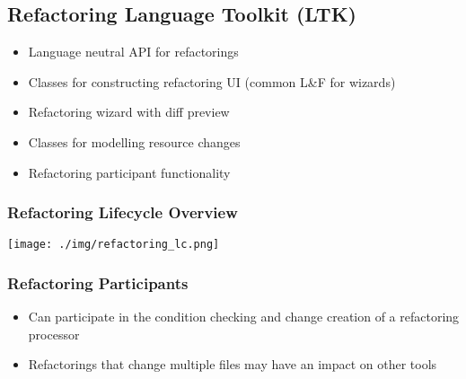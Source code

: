 \subsection{Refactoring Language Toolkit (LTK)}
\begin{itemize}
    \item Language neutral API for refactorings
    \item Classes for constructing refactoring UI (common L\&F for wizards)
    \item Refactoring wizard with diff preview
    \item Classes for modelling resource changes
    \item Refactoring participant functionality
\end{itemize}
\subsubsection{Refactoring Lifecycle Overview}
\texttt{[image: ./img/refactoring\_lc.png]}

\subsubsection{Refactoring Participants}
\begin{itemize}
    \item Can participate in the condition checking and change creation of a refactoring processor
    \item Refactorings that change multiple files may have an impact on other tools
\end{itemize}

